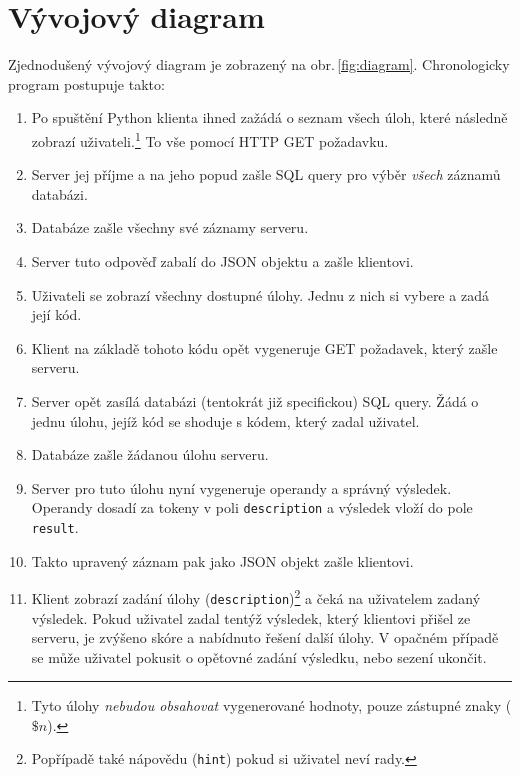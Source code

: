 \documentclass[titlepage]{article}
\begin{document}
\section{Vývojový diagram}
Zjednodušený vývojový diagram je zobrazený na obr.\,\ref{fig:diagram}. Chronologicky program postupuje takto:
\begin{enumerate}
    \item Po spuštění Python klienta ihned zažádá o seznam všech úloh, které následně zobrazí uživateli.\footnote{Tyto úlohy \emph{nebudou obsahovat} vygenerované hodnoty, pouze zástupné znaky ($\$n$).} To vše pomocí HTTP GET po\-ža\-davku.
    \item Server jej příjme a na jeho popud zašle SQL query pro výběr \emph{všech} zá\-zna\-mů databázi. 
    \item Databáze zašle všechny své záznamy serveru.
    \item Server tuto odpověď zabalí do JSON objektu a zašle klientovi. 
    \item Uživateli se zobrazí všechny dostupné úlohy. Jednu z nich si vybere a zadá její kód.
    \item Klient na základě tohoto kódu opět vygeneruje  GET požadavek, který zašle serveru. 
    \item Server opět zasílá databázi (tentokrát již specifickou) SQL query. Žádá o jednu úlohu, jejíž kód se shoduje s kódem, který zadal uživatel. 
    \item Databáze zašle žádanou úlohu serveru. 
    \item Server pro tuto úlohu nyní vygeneruje operandy a správný výsledek. Operandy dosadí za tokeny  v poli \texttt{description} a výsledek vloží do pole \texttt{result}. 
    \item Takto upravený záznam pak jako JSON objekt zašle klientovi.
    \item Klient zobrazí zadání úlohy (\texttt{description})\footnote{Popřípadě také nápovědu (\texttt{hint}) pokud si uživatel neví rady.} a čeká na uživatelem zadaný výsledek. Pokud uživatel zadal tentýž výsledek, který klientovi přišel ze serveru, je zvýšeno skóre a nabídnuto řešení další úlohy. V opačném případě se může uživatel pokusit o opětovné zadání výsledku, nebo sezení ukončit. 
\end{enumerate}
\end{document}
